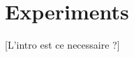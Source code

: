 


        
    




\section{Experiments}
\label{section:experiments}
[L'intro est ce necessaire ?]


